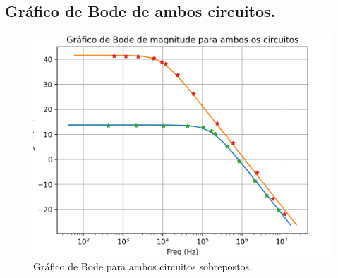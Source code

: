 \subsection{Gráfico de Bode de ambos circuitos.}


\begin{figure}[H]
    \centering
    \includegraphics[width=1\columnwidth]{images/bodeboth.png}
    \caption{Gráfico de Bode para ambos circuitos sobrepostos.}
\end{figure}

